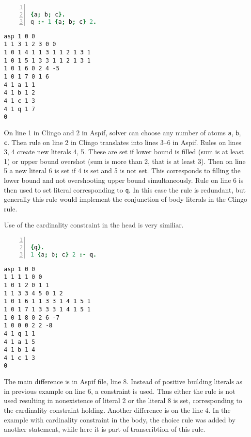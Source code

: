 \documentclass[
    digital,
    color,
    oneside,
    sansbold,
    lot,
    nolof
]{fithesis}
\begin{document}
\begin{minipage}[t]{0.45\linewidth}
\centering
\begin{lstlisting}[language=prolog, numbers=left, countblanklines=false]

{a; b; c}.
q :- 1 {a; b; c} 2.
\end{lstlisting}
\end{minipage}
\hspace{1em}
\begin{minipage}[t]{0.45\linewidth}
\centering
\begin{lstlisting}[numbers=right, countblanklines=false]
asp 1 0 0
1 1 3 1 2 3 0 0
1 0 1 4 1 1 3 1 1 2 1 3 1
1 0 1 5 1 3 3 1 1 2 1 3 1
1 0 1 6 0 2 4 -5
1 0 1 7 0 1 6
4 1 a 1 1
4 1 b 1 2
4 1 c 1 3
4 1 q 1 7
0
\end{lstlisting}
\end{minipage}
On line 1 in Clingo and 2 in Aspif, solver can choose any number of atoms
\texttt{a}, \texttt{b}, \texttt{c}. Then rule on line 2 in Clingo translates
into lines 3--6 in Aspif. Rules on lines 3, 4 create new literals 4, 5. These
are set if lower bound is filled (sum is at least 1) or upper bound overshot
(sum is more than 2, that is at least 3). Then on line 5
a new literal 6 is set if 4 is set and 5 is not set. This corresponds
to filling the lower bound and not overshooting upper bound simultaneously.
Rule on line 6 is then used to set literal corresponding to \texttt{q}.
In this case the rule is redundant, but generally this rule would implement
the conjunction of body literals in the Clingo rule.

Use of the cardinality constraint in the head is very similiar.

\begin{minipage}[t]{0.45\linewidth}
\centering
\begin{lstlisting}[language=prolog, numbers=left, countblanklines=false]

{q}.
1 {a; b; c} 2 :- q.
\end{lstlisting}
\end{minipage}
\hspace{1em}
\begin{minipage}[t]{0.45\linewidth}
\centering
\begin{lstlisting}[numbers=right, countblanklines=false]
asp 1 0 0
1 1 1 1 0 0
1 0 1 2 0 1 1
1 1 3 3 4 5 0 1 2
1 0 1 6 1 1 3 3 1 4 1 5 1
1 0 1 7 1 3 3 3 1 4 1 5 1
1 0 1 8 0 2 6 -7
1 0 0 0 2 2 -8
4 1 q 1 1
4 1 a 1 5
4 1 b 1 4
4 1 c 1 3
0
\end{lstlisting}
\end{minipage}
The main difference is in Aspif file, line 8. Instead of positive building
literals as in previous example on line 6, a constraint is used. Thus either the
rule is not used resulting in nonexistence of literal 2 or the literal 8
is set, corresponding to the cardinality constraint holding.
Another difference is on the line 4. In the example with cardinality constraint
in the body, the choice rule was added by another statement, while here it is
part of transcribtion of this rule.
\end{document}
